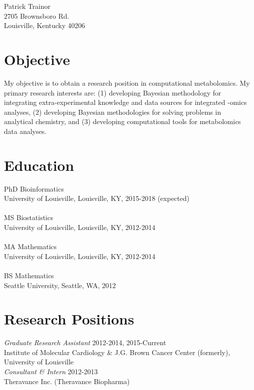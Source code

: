 \begin{center}
Patrick Trainor \\ 
2705 Brownsboro Rd. \\ 
Louisville, Kentucky 40206 \\
\end{center}

\bigskip
{\parindent0pt

\section*{Objective}
My objective is to obtain a research position in computational metabolomics. My primary research interests are: (1) developing Bayesian methodology for integrating extra-experimental knowledge and data sources for integrated -omics analyses, (2) developing Bayesian methodologies for solving problems in analytical chemistry, and (3) developing computational tools for metabolomics data analyses.  

\section*{Education}
 PhD Bioinformatics  \\
University of Louisville, Louisville, KY, 2015-2018 (expected)  \\ \\
 MS Biostatistics  \\
University of Louisville, Louisville, KY, 2012-2014  \\ \\
MA Mathematics  \\
University of Louisville, Louisville, KY, 2012-2014 \\ \\
BS Mathematics  \\
Seattle University, Seattle, WA, 2012

\section*{Research Positions}
\emph{Graduate Research Assistant} \hfill 2012-2014, 2015-Current \\
Institute of Molecular Cardiology \& J.G. Brown Cancer Center (formerly), University of Louisville \\

\emph{Consultant \& Intern} \hfill 2012-2013 \\
Theravance Inc. (Theravance Biopharma) 

}
